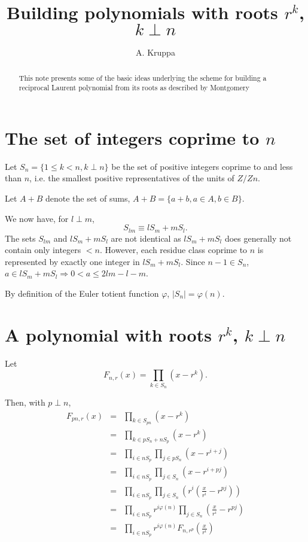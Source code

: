 \documentclass{article}
\begin{document}
\title{Building polynomials with roots $r^k$, $k\perp n$}
\author{A. Kruppa}
\maketitle


\begin{abstract}
This note presents some of the basic ideas underlying the scheme for building 
a reciprocal Laurent polynomial from its roots as described by Montgomery 
\cite{Montgomery2007}
\end{abstract}

\section{The set of integers coprime to $n$}
Let $S_n = \{1 \leq k < n, k \perp n\}$ be the set of positive integers 
coprime to and less than $n$, i.e. the smallest positive representatives of 
the units of $Z/Zn$.

Let $A + B$ denote the set of sums, $A + B = \{a+b, a\in A, b\in B\}$.

We now have, for $l \perp m$, 
\begin{displaymath}
S_{lm} \equiv lS_m + mS_l.
\end{displaymath}
The sets $S_{lm}$ and $lS_m + mS_l$ are not identical as $lS_m + mS_l$ does 
generally not contain only integers $<n$. However, each residue class coprime
to $n$ is represented by exactly one integer in $lS_m + mS_l$. 
Since $n-1 \in S_n$, 
$a \in lS_m + mS_l \Rightarrow 0 < a \leq 2lm - l - m$.


By definition of the Euler totient function $\varphi$, $|S_n| = \varphi(n)$.

\section{A polynomial with roots $r^k$, $k\perp n$}
Let
\begin{displaymath}
F_{n,r}(x) = \prod_{k \in S_n} (x-r^k).
\end{displaymath}

Then, with $p \perp n$,
\begin{eqnarray*}
F_{pn,r}(x) & = & \prod_{k \in S_{pn}} \left(x-r^k\right) \\
            & = & \prod_{k \in pS_n + nS_p} \left(x-r^k\right) \\
            & = & \prod_{i \in nS_p} \prod_{j \in pS_n} \left(x-r^{i+j}\right) \\
            & = & \prod_{i \in nS_p} \prod_{j \in S_n} \left(x-r^{i+pj}\right) \\
            & = & \prod_{i \in nS_p} \prod_{j \in S_n} \left(r^i \left(\frac{x}{r^i}-r^{pj}\right)\right) \\
            & = & \prod_{i \in nS_p} r^{i\varphi(n)} \prod_{j \in S_n} \left(\frac{x}{r^i}-r^{pj}\right) \\
            & = & \prod_{i \in nS_p} r^{i\varphi(n)} F_{n,r^p}\left(\frac{x}{r^i}\right)
\end{eqnarray*}
\end{document}
